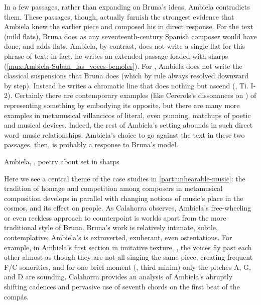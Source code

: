 In a few passages, rather than expanding on Bruna's ideas, Ambiela contradicts
them.
These passages, though, actually furnish the strongest evidence that Ambiela
knew the earlier piece and composed his in direct response.
For the text  (mild flats), Bruna does as any
seventeenth-century Spanish composer would have done, and adds flats.
Ambiela, by contrast, does not write a single flat for this phrase of text; in
fact, he writes an extended passage loaded with sharps
(\cref{mux:Ambiela-Suban_las_voces-bemoles}).
For , Ambiela does not write the classical
suspensions that Bruna does (which by rule always resolved downward by step).
Instead he writes a chromatic line that does nothing but ascend
(, Ti. I-2). 
Certainly there are contemporary examples (like Cererols's dissonances on
) of representing something by embodying its
opposite, but there are many more examples in metamusical villancicos of
literal, even punning, matchups of poetic and musical devices. 
Indeed, the rest of Ambiela's setting abounds in such direct word--music
relationships.
Ambiela's choice to go against the text in these two passages, then, is
probably a response to Bruna's model.

{Ambiela, , poetry about  set in sharps}

Here we see a central theme of the case studies in
\cref{part:unhearable-music}: the tradition of homage and competition among
composers in metamusical composition develops in parallel with changing notions
of music's place in the cosmos, and its effect on people.
As Calahorra observes, Ambiela's free-wheeling or even reckless approach to
counterpoint is worlds apart from the more traditional style of Bruna.
Bruna's work is relatively intimate, subtle, contemplative; Ambiela's is
extroverted, exuberant, even ostentatious.
For example, in Ambiela's first section in imitative texture, ,
the voices fly past each other almost as though they are not all singing the
same piece, creating frequent F\na{}/C\sh{} sonorities, and for one brief
moment (, third minim) only the pitches A, G, and D are sounding.
Calahorra provides an analysis of Ambiela's abruptly shifting cadences and
pervasive use of seventh chords on the first beat of the compás.

